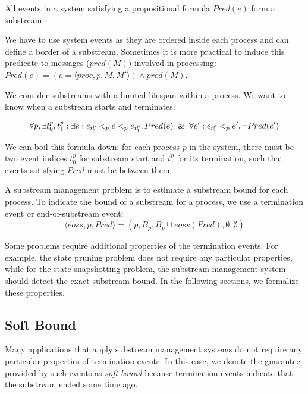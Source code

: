 \begin{definition}[Substream]
All events in a system satisfying a propositional formula $Pred(e)$ form a substream.
\end{definition}

We have to use system events as they are ordered inside each process and can define a border of a substream. Sometimes it is more practical to induce this predicate to messages ($pred(M)$) involved in processing: $Pred(e) = (e = \langle proc, p, M, M'\rangle) \wedge pred(M)$.

We consider substreams with a limited lifespan within a process. We want to know when a substream starts and terminates: 

\begin{equation}
\forall p, \exists t_0^p, t_1^p: \exists e: e_{t_0^p} <_p e <_p e_{t_1^p}, Pred(e) \And \forall e': e_{t_1^p} <_p e', \neg Pred(e') 
\end{equation}

We can boil this formula down: for each process $p$ in the system, there must be two event indices $t_0^p$ for substream start and $t_1^p$ for its termination, such that events satisfying $Pred$ must be between them. 

\begin{definition}
A substream management problem is to estimate a substream bound for each process. To indicate the bound of a substream for a process, we use a termination event or end-of-substream event:
\begin{equation}
  \langle eoss, p, Pred \rangle = (p, B_p, B_p\cup eoss(Pred), \emptyset, \emptyset)  
\end{equation}
\end{definition}

Some problems require additional properties of the termination events. For example, the state pruning problem does not require any particular properties, while for the state snapshotting problem, the substream management system should detect the exact substream bound. In the following sections, we formalize these properties. 

\subsection{Soft Bound}

Many applications that apply substream management systems do not require any particular properties of termination events. In this case, we denote the guarantee provided by such events as {\em soft bound} because termination events indicate that the substream ended some time ago.

